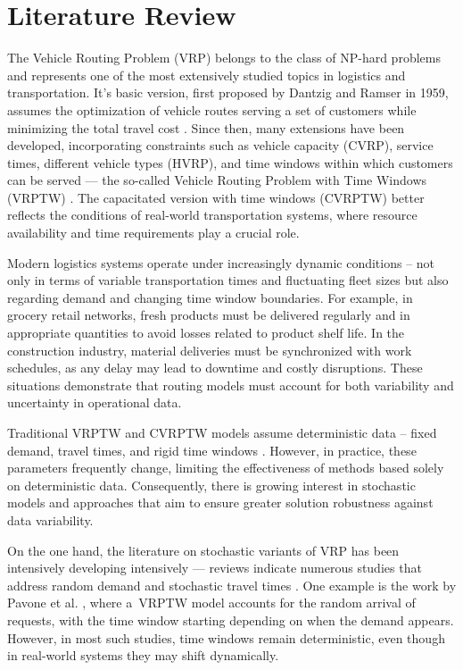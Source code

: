 \section{Literature Review}
The Vehicle Routing Problem (VRP) belongs to the class of NP-hard problems and represents one of the most extensively studied topics in logistics and transportation. It's basic version, first proposed by Dantzig and Ramser in 1959, assumes the optimization of vehicle routes serving a set of customers while minimizing the total travel cost \cite{Dantzig1959}. Since then, many extensions have been developed, incorporating constraints such as vehicle capacity (CVRP), service times, different vehicle types (HVRP), and time windows within which customers can be served — the so-called Vehicle Routing Problem with Time Windows (VRPTW) \cite{Toth2014, Golden2008}. The capacitated version with time windows (CVRPTW) better reflects the conditions of real-world transportation systems, where resource availability and time requirements play a crucial role.

Modern logistics systems operate under increasingly dynamic conditions -- not only in terms of variable transportation times and fluctuating fleet sizes but also regarding demand and changing time window boundaries. For example, in grocery retail networks, fresh products must be delivered regularly and in appropriate quantities to avoid losses related to product shelf life. In the construction industry, material deliveries must be synchronized with work schedules, as any delay may lead to downtime and costly disruptions. These situations demonstrate that routing models must account for both variability and uncertainty in operational data.

Traditional VRPTW and CVRPTW models assume deterministic data -- fixed demand, travel times, and rigid time windows \cite{surveyBraekers, RCVRPTWreviewYernar}. However, in practice, these parameters frequently change, limiting the effectiveness of methods based solely on deterministic data. Consequently, there is growing interest in stochastic models and approaches that aim to ensure greater solution robustness against data variability.

On the one hand, the literature on stochastic variants of VRP has been intensively developing intensively — reviews indicate numerous studies that address random demand and stochastic travel times \cite{Oyola2018, Bomboi2022}. One example is the work by Pavone et al. \cite{Pavone2009}, where a~VRPTW model accounts for the random arrival of requests, with the time window starting depending on when the demand appears. However, in most such studies, time windows remain deterministic, even though in real-world systems they may shift dynamically.

